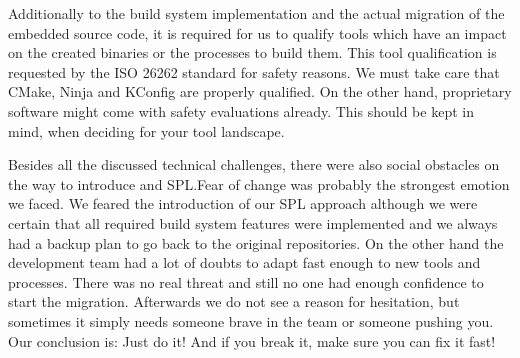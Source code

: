 Additionally to the build system implementation and the actual migration of the
embedded source code, it is required for us to qualify tools which have an
impact on the created binaries or the processes to build them. This tool
qualification is requested by the ISO 26262 standard for safety reasons. We must
take care that CMake, Ninja and KConfig are properly qualified. On the other
hand, proprietary software might come with safety evaluations already. This
should be kept in mind, when deciding for your tool landscape.

Besides all the discussed technical challenges, there were also social obstacles
on the way to introduce and SPL.\@ Fear of change was probably the strongest
emotion we faced. We feared the introduction of our SPL approach although we
were certain that all required build system features were implemented and we
always had a backup plan to go back to the original repositories. On the other
hand the development team had a lot of doubts to adapt fast enough to new tools
and processes. There was no real threat and still no one had enough confidence
to start the migration. Afterwards we do not see a reason for hesitation, but
sometimes it simply needs someone brave in the team or someone pushing you. Our
conclusion is: Just do it! And if you break it, make sure you can fix it fast!
